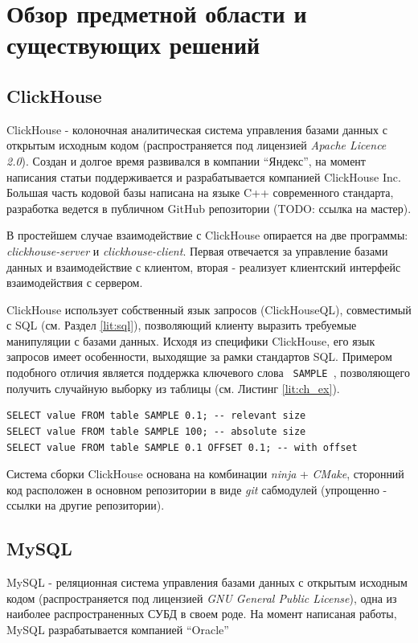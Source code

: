 \section{Обзор предметной области и существующих решений}
\subsection{ClickHouse} \label{lit:ch}
ClickHouse - колоночная аналитическая система управления базами данных с открытым исходным кодом (распространяется под лицензией \textit{Apache Licence 2.0}). Создан и долгое время развивался в компании \enquote{Яндекс}, на момент написания статьи поддерживается и разрабатывается компанией ClickHouse Inc. Большая часть кодовой базы написана на языке C++ современного стандарта, разработка ведется в публичном GitHub репозитории (TODO: ссылка на мастер). 

В простейшем случае взаимодействие с ClickHouse опирается на две программы: \textit{clickhouse-server} и \textit{clickhouse-client}. Первая отвечается за управление базами данных и взаимодействие с клиентом, вторая - реализует клиентский интерфейс взаимодействия с сервером.

ClickHouse использует собственный язык запросов (ClickHouseQL), совместимый с SQL (см. Раздел \ref{lit:sql}), позволяющий клиенту выразить требуемые манипуляции с базами данных. Исходя из специфики ClickHouse, его язык запросов имеет особенности, выходящие за рамки стандартов SQL. Примером подобного отличия является поддержка ключевого слова \texttt{ SAMPLE }, позволяющего получить случайную выборку из таблицы (см. Листинг \ref{lit:ch_ex}).

\begin{code}
    \label{lit:ch_ex}
    \begin{verbatim}
SELECT value FROM table SAMPLE 0.1; -- relevant size
SELECT value FROM table SAMPLE 100; -- absolute size
SELECT value FROM table SAMPLE 0.1 OFFSET 0.1; -- with offset
    \end{verbatim}
\end{code}

Система сборки ClickHouse основана на комбинации \textit{ninja} + \textit{CMake}, сторонний код расположен в основном репозитории в виде \textit{git} сабмодулей (упрощенно - ссылки на другие репозитории). 

\subsection{MySQL} \label{lit:mysql}
MySQL - реляционная система управления базами данных с открытым исходным кодом (распространяется под лицензией \textit{GNU General Public License}), одна из наиболее распространенных СУБД в своем роде. На момент написаная работы, MySQL разрабатывается компанией \enquote{Oracle} 


